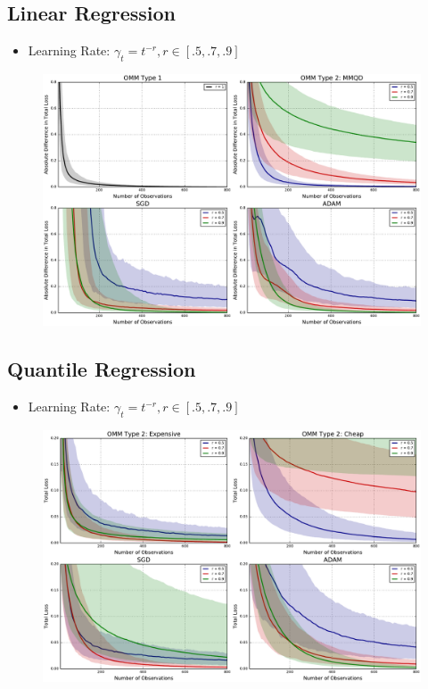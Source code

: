 \documentclass{beamer}
\begin{document}
\subsection{Linear Regression}
\begin{frame}
  \begin{itemize}
    \item Learning Rate: $\gamma_t = t^{-r}, r\in[.5, .7, .9]$
  \end{itemize}
  \begin{figure}
    \includegraphics[width=\textwidth]{figures/linregmm_simulation.pdf}
  \end{figure}
\end{frame}

\subsection{Quantile Regression}
\begin{frame}
  \begin{itemize}
    \item Learning Rate: $\gamma_t = t^{-r}, r\in[.5, .7, .9]$
  \end{itemize}
  \begin{figure}
    \includegraphics[width=\textwidth]{figures/quantreg_simulation.pdf}
  \end{figure}
\end{frame}
\end{document}
